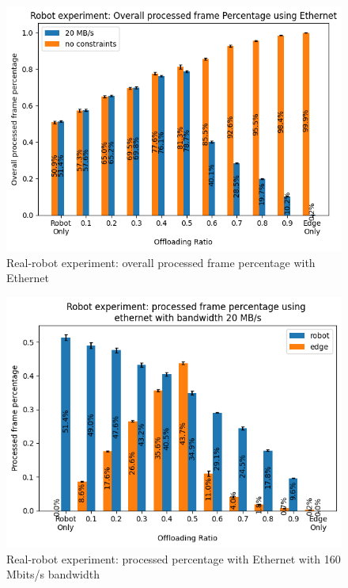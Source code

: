 \begin{figure}
    \centering
    \includegraphics[width=\linewidth]{figures/experiment/real_robot/eth/overall_processed_frame_percentage.png}
    \caption{Real-robot experiment: overall processed frame percentage with Ethernet}
    \label{fig:real_robot_experiment:eth_overall_processed_frame_percentage}
\end{figure}

\begin{figure}
    \centering
    \includegraphics[width=\linewidth]{figures/experiment/real_robot/eth/frame_percentage_160.png}
    \caption{Real-robot experiment: processed percentage with Ethernet with 160 Mbits/s bandwidth}
    \label{fig:real_robot_experiment:eth_processed_frame_percentage_160}
\end{figure}

